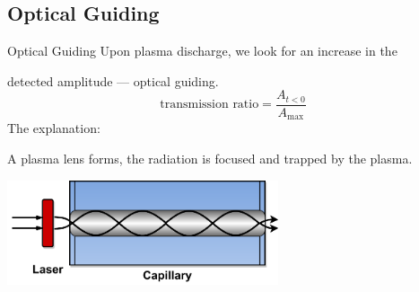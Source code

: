 \documentclass[dvipsnames]{beamer}
\begin{document}
\subsection{Optical Guiding}
% 
 
\begin{frame}{Optical Guiding}
Upon plasma discharge, we look for an increase in the

detected amplitude --- optical guiding.
\begin{equation*}
\text{transmission ratio} = \frac{A_{t<0}}{A_\text{max}}
\end{equation*}
The explanation:

A plasma lens forms, the radiation is focused and trapped by the plasma.
\begin{center}
 \includegraphics[width=0.6\textwidth]{figures/results/oscillator/chen_4_31.pdf}
\end{center}

\end{frame}
\end{document}
